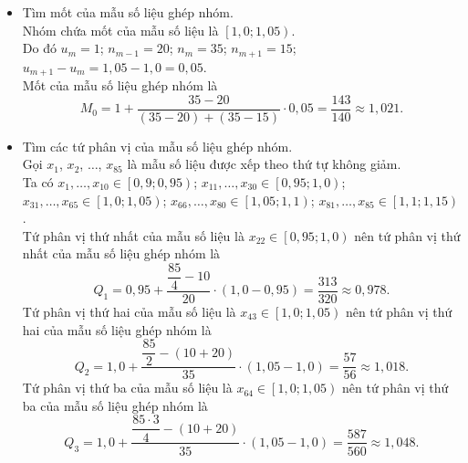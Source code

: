 \begin{bt}
{\begin{itemize}
			\item Tìm mốt của mẫu số liệu ghép nhóm.\\
			Nhóm chứa mốt của mẫu số liệu là $ \left[ 1{,}0 ; 1{,}05\right) $.\\
			Do đó $ u_m=1$; $ n_{m-1}=20 $; $ n_m=35 $; $ n_{m+1}=15 $; $ u_{m+1}-u_m=1{,}05-1{,}0=0{,}05 $.\\
			Mốt của mẫu số liệu ghép nhóm là $$M_0=1+\dfrac{35-20}{(35-20)+(35-15)}\cdot 0{,}05 =\dfrac{143}{140}\approx 1{,}021.$$  
			\item Tìm các tứ phân vị của mẫu số liệu ghép nhóm.\\
			Gọi $ x_1 $, $ x_2 $, $ \ldots $, $ x_{85} $ là mẫu số liệu được xếp theo thứ tự không giảm.\\
			Ta có $ x_1, \ldots, x_{10}\in  \left[ 0{,}9 ; 0{,}95\right)$; $ x_{11}, \ldots, x_{30}\in  \left[ 0{,}95 ; 1{,}0\right) $; $ x_{31}, \ldots, x_{65}\in   \left[ 1{,}0 ; 1{,}05\right) $; $ x_{66}, \ldots, x_{80}\in \left[ 1{,}05 ; 1{,}1\right) $; $ x_{81}, \ldots, x_{85}\in \left[ 1{,}1 ; 1{,}15\right)$.\\
			Tứ phân vị thứ nhất của mẫu số liệu là $ x_{22} \in  \left[ 0{,}95 ; 1{,}0\right) $ nên tứ phân vị thứ nhất của mẫu số liệu ghép nhóm là 
			$$Q_1=0{,}95+\dfrac{\dfrac{85}{4}-10}{20}\cdot \left( 1{,}0-0{,}95\right)=  \dfrac{313}{320}\approx 0{,}978.$$
			Tứ phân vị thứ hai của mẫu số liệu là $ x_{43} \in  \left[ 1{,}0 ; 1{,}05\right) $ nên tứ phân vị thứ hai của mẫu số liệu ghép nhóm là 
			$$Q_2=1{,}0+\dfrac{\dfrac{85}{2}-(10+20)}{35}\cdot \left( 1{,}05-1{,}0\right)=\dfrac{57}{56} \approx 1{,}018.$$
			Tứ phân vị thứ ba của mẫu số liệu là $ x_{64} \in  \left[ 1{,}0 ; 1{,}05\right) $ nên tứ phân vị thứ ba của mẫu số liệu ghép nhóm là 
			$$Q_3=1{,}0+\dfrac{\dfrac{85\cdot 3}{4}-(10+20)}{35}\cdot \left( 1{,}05-1{,}0\right)=\dfrac{587}{560} \approx 1{,}048.$$
		\end{itemize}
	}
\end{bt}

